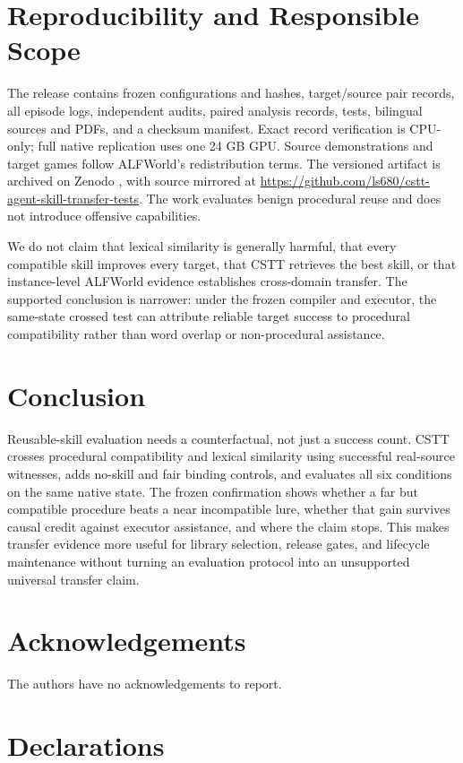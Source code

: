 \documentclass[pdflatex,sn-mathphys-num]{sn-jnl}
\begin{document}
\section{Reproducibility and Responsible Scope}
The release contains frozen configurations and hashes, target/source pair
records, all episode logs, independent audits, paired analysis records, tests,
bilingual sources and PDFs, and a checksum manifest. Exact record verification
is CPU-only; full native replication uses one 24 GB GPU. Source demonstrations
and target games follow ALFWorld's redistribution terms. The versioned artifact
is archived on Zenodo \citep{liang2026cstt}, with source mirrored at
\url{https://github.com/ls680/cstt-agent-skill-transfer-tests}. The work
evaluates benign procedural reuse and does not introduce offensive capabilities.

We do not claim that lexical similarity is generally harmful, that every
compatible skill improves every target, that CSTT retrieves the best skill, or
that instance-level ALFWorld evidence establishes cross-domain transfer. The
supported conclusion is narrower: under the frozen compiler and executor, the
same-state crossed test can attribute reliable target success to procedural
compatibility rather than word overlap or non-procedural assistance.

\section{Conclusion}
Reusable-skill evaluation needs a counterfactual, not just a success count.
CSTT crosses procedural compatibility and lexical similarity using successful
real-source witnesses, adds no-skill and fair binding controls, and evaluates
all six conditions on the same native state. The frozen confirmation shows
whether a far but compatible procedure beats a near incompatible lure, whether
that gain survives causal credit against executor assistance, and where the
claim stops. This makes transfer evidence more useful for library selection,
release gates, and lifecycle maintenance without turning an evaluation protocol
into an unsupported universal transfer claim.

\backmatter

\section*{Acknowledgements}
The authors have no acknowledgements to report.

\section*{Declarations}
\end{document}

